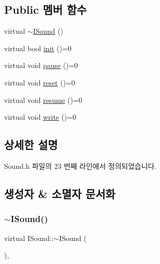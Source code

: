 \subsection*{Public 멤버 함수}
\begin{DoxyCompactItemize}
\item 
virtual \mbox{\hyperlink{class_i_sound_ad968d59f5fdb16f050b3c74108c693b5}{$\sim$\+I\+Sound}} ()
\item 
virtual bool \mbox{\hyperlink{class_i_sound_ac14f05f2d5050cfefa4133099d9f656e}{init}} ()=0
\item 
virtual void \mbox{\hyperlink{class_i_sound_a9fb848e0e31ab8bcd5384b0422855c3d}{pause}} ()=0
\item 
virtual void \mbox{\hyperlink{class_i_sound_a7ca59c529f3abce2dd4ed8d8da243c5e}{reset}} ()=0
\item 
virtual void \mbox{\hyperlink{class_i_sound_a8e0adea68f52a7f0392a3988a558aaf0}{resume}} ()=0
\item 
virtual void \mbox{\hyperlink{class_i_sound_ad7913f5fa003c06e8e1a930f760d20e2}{write}} ()=0
\end{DoxyCompactItemize}


\subsection{상세한 설명}


Sound.\+h 파일의 23 번째 라인에서 정의되었습니다.



\subsection{생성자 \& 소멸자 문서화}
\mbox{\label{class_i_sound_ad968d59f5fdb16f050b3c74108c693b5}} 
\subsubsection{\texorpdfstring{$\sim$\+I\+Sound()}{~ISound()}}
{\footnotesize\ttfamily virtual I\+Sound\+::$\sim$\+I\+Sound (\begin{DoxyParamCaption}{ }\end{DoxyParamCaption})\hspace{0.3cm}{\ttfamily [inline]}, {\ttfamily [virtual]}}



